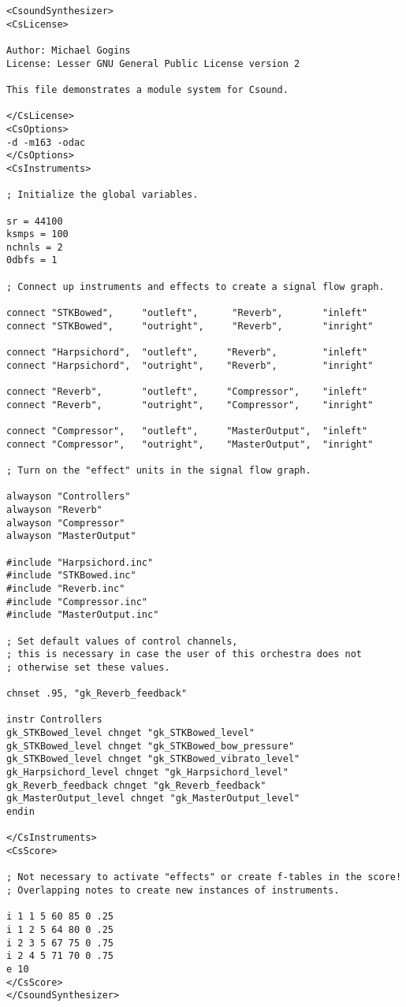 \documentclass[12pt,letterpaper,onecolumn]{scrartcl}
\begin{document}
\begin{lstlisting}
<CsoundSynthesizer>
<CsLicense>

Author: Michael Gogins
License: Lesser GNU General Public License version 2

This file demonstrates a module system for Csound.

</CsLicense>
<CsOptions>
-d -m163 -odac
</CsOptions>
<CsInstruments>

; Initialize the global variables.

sr = 44100
ksmps = 100
nchnls = 2
0dbfs = 1

; Connect up instruments and effects to create a signal flow graph.

connect "STKBowed",     "outleft",      "Reverb",     	"inleft"
connect "STKBowed",     "outright",     "Reverb",     	"inright"

connect "Harpsichord",  "outleft",     "Reverb",     	"inleft"
connect "Harpsichord",  "outright",    "Reverb",     	"inright"

connect "Reverb", 		"outleft",     "Compressor",    "inleft"
connect "Reverb", 		"outright",    "Compressor",    "inright"

connect "Compressor",   "outleft",     "MasterOutput",  "inleft"
connect "Compressor",   "outright",    "MasterOutput",  "inright"

; Turn on the "effect" units in the signal flow graph.

alwayson "Controllers"
alwayson "Reverb"
alwayson "Compressor"
alwayson "MasterOutput"

#include "Harpsichord.inc"
#include "STKBowed.inc"
#include "Reverb.inc"
#include "Compressor.inc"
#include "MasterOutput.inc"

; Set default values of control channels,
; this is necessary in case the user of this orchestra does not
; otherwise set these values.

chnset .95, "gk_Reverb_feedback"

instr Controllers
gk_STKBowed_level chnget "gk_STKBowed_level"
gk_STKBowed_level chnget "gk_STKBowed_bow_pressure"
gk_STKBowed_level chnget "gk_STKBowed_vibrato_level"
gk_Harpsichord_level chnget "gk_Harpsichord_level"
gk_Reverb_feedback chnget "gk_Reverb_feedback"
gk_MasterOutput_level chnget "gk_MasterOutput_level"
endin

</CsInstruments>
<CsScore>

; Not necessary to activate "effects" or create f-tables in the score!
; Overlapping notes to create new instances of instruments.

i 1 1 5 60 85 0 .25
i 1 2 5 64 80 0 .25
i 2 3 5 67 75 0 .75
i 2 4 5 71 70 0 .75
e 10
</CsScore>
</CsoundSynthesizer>
\end{lstlisting}
\end{document}

